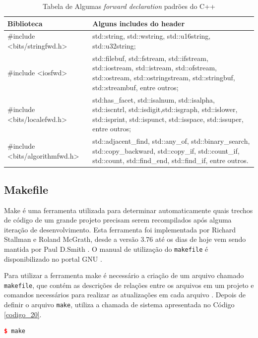 \begin{table}[h]
    \centering
	\caption {Tabela de Algumas \textit{forward declaration} padrões do C++}
    \label{tab:tabela_04}
	\begin{tabularx}{0.95\textwidth}{>{\ttfamily}l>{\ttfamily}X}
	\toprule
	\textbf{Biblioteca} & \textbf{Alguns includes do header}\\
	\midrule
	\#include <bits/stringfwd.h> & std::string, std::wstring, std::u16string, std::u32string; \\
	\midrule
	\#include <iosfwd>          & std::filebuf, std::fstream, std::ifstream, std::iostream, std::istream, std::ofstream, std::ostream, std::ostringstream, std::stringbuf, std::streambuf, entre outros;\\
	\midrule
	\#include <bits/localefwd.h> & std:has\_facet, std::isalnum, std::isalpha, std::iscntrl, std::isdigit,std::isgraph, std::islower, std::isprint, std::ispunct, std::isspace, std::issuper, entre outros;\\
	\midrule
	\#include <bits/algorithmfwd.h> & std::adjacent\_find, std::any\_of, std::binary\_search, std::copy\_backward, std::copy\_if, std::count\_if, std::count, std::find\_end, std::find\_if, entre outros.\\
	\bottomrule
	\end{tabularx}
\end{table}


\subsection{Makefile}\label{Makefile_section}


Make é uma ferramenta utilizada para determinar automaticamente quais
 trechos de código de um grande projeto precisam serem recompilados
 após alguma iteração de desenvolvimento. Esta ferramenta foi implementada
 por Richard Stallman e Roland McGrath, desde a versão 3.76 até os dias de
 hoje vem sendo mantida por Paul D.Smith \cite{Lasca2}. O manual de utilização do \texttt{makefile}
 é disponibilizado no portal GNU \cite{ref45}.

Para utilizar a ferramenta make é necessário a criação de um arquivo chamado
 \texttt{makefile}, que contém as descrições de relações entre os arquivos em um projeto
 e comandos necessários para realizar as atualizações em cada arquivo \cite{Lasca2}.
 Depois de definir o arquivo \texttt{make}, utiliza a chamada de sistema apresentada 
no Código \ref{codigo_20}.

\begin{lstlisting}[language=C++,caption={
                             Chamada de sistema para executar o programa make},
				                                                label=codigo_20]
    $ make
\end{lstlisting}


